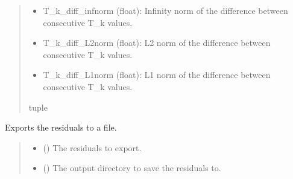 \documentclass[a4paper,11pt,english,openany]{sphinxmanual}
\begin{document}
\begin{fulllineitems}
\begin{fulllineitems}
\begin{quote}
\begin{description}
\begin{description}
\begin{itemize}
\item {} 
\sphinxAtStartPar
T\_k\_diff\_infnorm (float): Infinity norm of the difference between consecutive T\_k values.

\item {} 
\sphinxAtStartPar
T\_k\_diff\_L2norm (float): L2 norm of the difference between consecutive T\_k values.

\item {} 
\sphinxAtStartPar
T\_k\_diff\_L1norm (float): L1 norm of the difference between consecutive T\_k values.

\end{itemize}

\end{description}


\sphinxAtStartPar
tuple

\end{description}\end{quote}

\end{fulllineitems}


\begin{fulllineitems}
\label{\detokenize{api/spyice.postprocess.analysis:src.spyice.postprocess.analysis.Analysis.export_residuals}}
\pysigstartsignatures
\pysiglinewithargsret
{}
{\sphinxparamcomma {}\sphinxparamcomma {}\sphinxparamcomma {}\sphinxparamcomma {}}
{}
\pysigstopsignatures
\sphinxAtStartPar
Exports the residuals to a file.
\begin{quote}\begin{description}
\begin{itemize}
\item {} 
\sphinxAtStartPar
{} () \textendash{} The residuals to export.

\item {} 
\sphinxAtStartPar
{} () \textendash{} The output directory to save the residuals to.


\end{itemize}
\end{description}
\end{quote}
\end{fulllineitems}
\end{fulllineitems}
\end{document}
